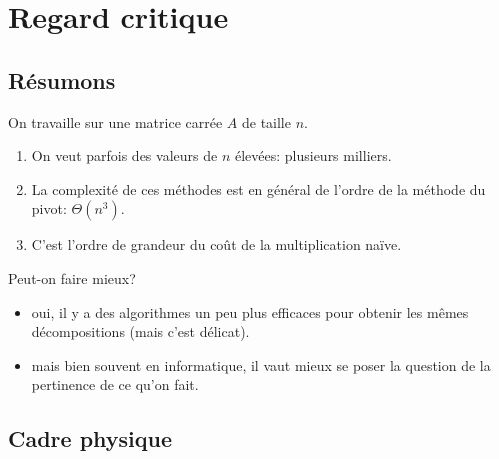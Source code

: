 % 
% 

\section{Regard critique}
\subsection{Résumons}

On travaille sur une matrice carrée $A$ de taille $n$.

\begin{enumerate}
\item On veut parfois des valeurs de $n$ élevées: plusieurs milliers.
\item La complexité de ces méthodes est en général de l'ordre de la
  méthode du pivot: $\Theta(n^{3})$.
\item C'est l'ordre de grandeur du coût de la multiplication naïve.
\end{enumerate}

Peut-on faire mieux?
\begin{itemize}
\item oui, il y a des algorithmes un peu plus
efficaces pour obtenir les mêmes décompositions (mais c'est délicat).
\item mais bien souvent en informatique, il vaut mieux se poser la
  question de la pertinence de ce qu'on fait.
\end{itemize}

\subsection{Cadre physique}

